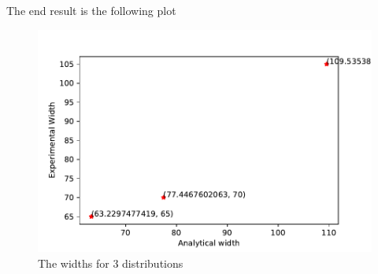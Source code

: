 \documentclass[letterpaper,12pt]{article}
\begin{document}
\begin{enumerate}
\begin{enumerate}
The end result is the following plot
\begin{figure}[H]
\begin{centering}
\includegraphics[width=5in]{widths.pdf}
\caption{The widths for 3 distributions}
\end{centering}
\end{figure}

\end{enumerate}

\end{enumerate}
\end{document}

